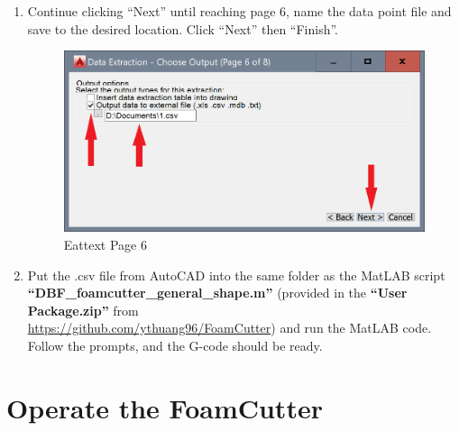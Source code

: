 \documentclass[titlepage,12pt,letter]{report}
\numberwithin{equation}{chapter}
\begin{document}
\begin{enumerate}[itemsep = 5pt,topsep=0pt]
	\item Continue clicking ``Next'' until reaching page 6, name the data point file and save to the desired location. Click ``Next'' then ``Finish''.
	\begin{figure} [H]
		\includegraphics[width = 0.6\linewidth]{./Figures/general_shape/cad9.png}
		\caption{Eattext Page 6}
	\end{figure}
	
	\item Put the .csv file from AutoCAD into the same folder as the MatLAB script \\ \textbf{``DBF\_foamcutter\_general\_shape.m''} (provided in the \textbf{``User Package.zip''} from \\ \href{https://github.com/ythuang96/FoamCutter}{https://github.com/ythuang96/FoamCutter}) and run the MatLAB code. Follow the prompts, and the G-code should be ready.
	
	
\end{enumerate}

\newpage




\newpage
\chapter{Operate the FoamCutter}
\end{document}
